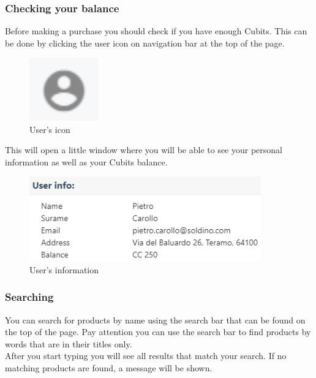 		\subsubsection{Checking your balance}
		Before making a purchase you should check if you have enough Cubits\glo.
		This can be done by clicking the user icon on navigation bar at the top 
		of the page.
		\begin{figure}[H]
			\includegraphics[width=3cm]{res/images/user_icon.png}
			\centering
			\caption{User's icon}
		\end{figure}
		\noindent This will open a little window where you will be able to see 
		your personal information as well as your Cubits balance.
		\begin{figure}[H]
			\includegraphics[width=10cm]{res/images/user_info.png}
			\centering
			\caption{User's information}
		\end{figure}
		\subsubsection{Searching}
		You can search for products by name using the search bar that can be 
		found on the top of the page. Pay attention you can use the search bar 
		to find products by words that are in their titles only. \\
		After you start typing you will see 
		all results that match your search. If no matching products are 
		found, a message will be shown.
%		
